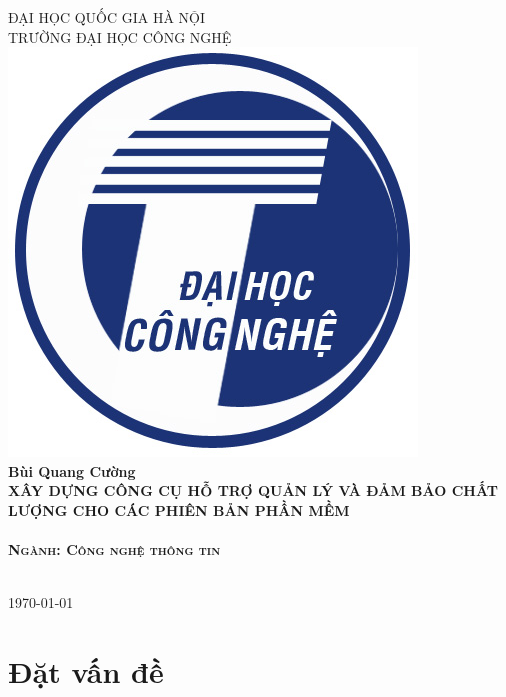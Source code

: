 \documentclass[12pt]{article}
\date{}
\begin{document}
	\begin{titlepage}
		\newcommand{\HRule}{\rule{\linewidth}{0.5mm}}
		
		\center %

		\textsc{\Large ĐẠI HỌC QUỐC GIA HÀ NỘI\\ TRƯỜNG ĐẠI HỌC CÔNG NGHỆ}\\[1cm]
		
		\includegraphics[width=0.2\linewidth]{images/uet}\\[1cm]
		
		{\Large  \bfseries Bùi Quang Cường}\\[2cm]
		
		{ \LARGE \bfseries XÂY DỰNG CÔNG CỤ HỖ TRỢ QUẢN LÝ VÀ ĐẢM BẢO CHẤT LƯỢNG CHO CÁC PHIÊN BẢN PHẦN MỀM}\\[0.5cm] %

		\hfill\\[3cm]
		
		\textsc{\Large \bfseries Ngành: Công nghệ thông tin}
		
		\hfill\\[4cm]
		
		{\large \today}\\[3cm]
		
		\vfill
		
	\end{titlepage}
	
	
	\tableofcontents
	\newpage
	
	\section*{Đặt vấn đề}
\end{document}
